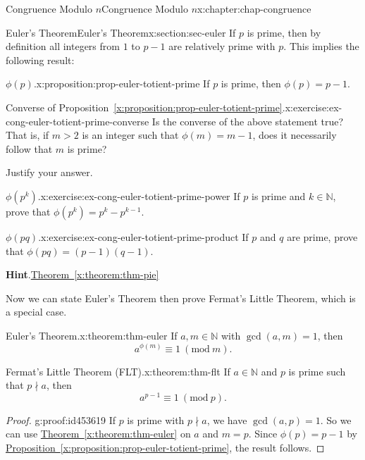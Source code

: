 \documentclass[oneside,10pt,]{book}
\newcommand{\blocktitlefont}{\relax}
\newcommand{\xreffont}{\relax}
\numberwithin{equation}{section}
\newcommand{\Mod}[1]{\ \left(\mathrm{mod}\ #1\right)}
\newcommand{\gt}{>}
\begin{document}
\begin{chapterptx}{Congruence Modulo \(n\)}{}{Congruence Modulo \(n\)}{}{}{x:chapter:chap-congruence}
\begin{sectionptx}{Euler's Theorem}{}{Euler's Theorem}{}{}{x:section:sec-euler}
If \(p\) is prime, then by definition all integers from \(1\) to \(p-1\) are relatively prime with \(p\). This implies the following result:%
\begin{proposition}{\(\phi(p)\).}{}{x:proposition:prop-euler-totient-prime}%
If \(p\) is prime, then \(\phi(p) = p-1\).%
\end{proposition}
\begin{inlineexercise}{Converse of Proposition~{\xreffont\ref*{x:proposition:prop-euler-totient-prime}}.}{x:exercise:ex-cong-euler-totient-prime-converse}%
Is the converse of the above statement true? That is, if \(m \gt 2\) is an integer such that \(\phi(m) = m-1\), does it necessarily follow that \(m\) is prime?%
\par
Justify your answer.%
\end{inlineexercise}
\begin{inlineexercise}{\(\phi(p^k)\).}{x:exercise:ex-cong-euler-totient-prime-power}%
If \(p\) is prime and \(k \in \mathbb{N}\), prove that \(\phi(p^k) = p^k - p^{k-1}\).%
\end{inlineexercise}
\begin{inlineexercise}{\(\phi(pq)\).}{x:exercise:ex-cong-euler-totient-prime-product}%
If \(p\) and \(q\) are prime, prove that \(\phi(pq) = (p-1)(q-1)\).%
\par\smallskip%
\noindent\textbf{\blocktitlefont Hint}.\hypertarget{g:hint:id453538}{}\quad{}\hyperref[x:theorem:thm-pie]{Theorem~{\xreffont\ref{x:theorem:thm-pie}}}%
\end{inlineexercise}
Now we can state Euler's Theorem then prove Fermat's Little Theorem, which is a special case.%
\begin{theorem}{Euler's Theorem.}{}{x:theorem:thm-euler}%
If \(a, m \in \mathbb{N}\) with \(\gcd(a,m) = 1\), then%
\begin{equation*}
a^{\phi(m)} \equiv 1 \Mod{m}\text{.}
\end{equation*}
%
\end{theorem}
\begin{theorem}{Fermat's Little Theorem (FLT).}{}{x:theorem:thm-flt}%
If \(a \in \mathbb{N}\) and \(p\) is prime such that \(p \nmid a\), then%
\begin{equation*}
a^{p-1} \equiv 1 \Mod{p}\text{.}
\end{equation*}
%
\end{theorem}
\begin{proof}{}{g:proof:id453619}
If \(p\) is prime with \(p \nmid a\), we have \(\gcd(a,p) = 1\). So we can use \hyperref[x:theorem:thm-euler]{Theorem~{\xreffont\ref{x:theorem:thm-euler}}} on \(a\) and \(m = p\). Since \(\phi(p) = p-1\) by \hyperref[x:proposition:prop-euler-totient-prime]{Proposition~{\xreffont\ref{x:proposition:prop-euler-totient-prime}}}, the result follows.%

\end{proof}
\end{sectionptx}
\end{chapterptx}
\end{document}
